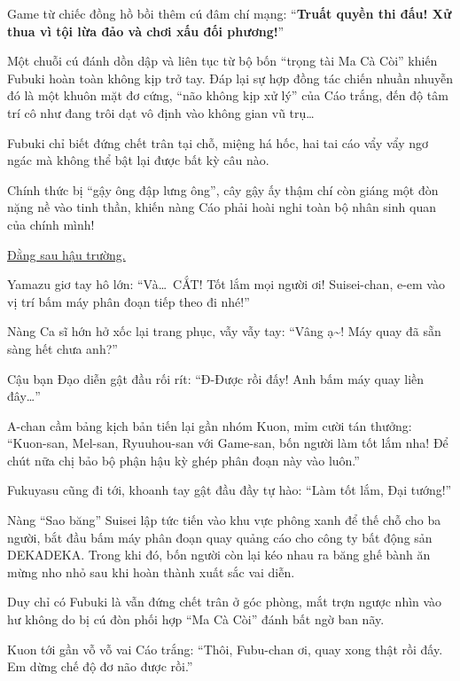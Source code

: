 \documentclass[../main.tex]{subfiles}
\begin{document}
Game từ chiếc đồng hồ bồi thêm cú đâm chí mạng: ``\textbf{Truất quyền thi đấu! Xử thua vì tội lừa đảo và chơi xấu đối phương!}''

Một chuỗi cú đánh dồn dập và liên tục từ bộ bốn ``trọng tài Ma Cà Còi'' khiến Fubuki hoàn toàn không kịp trở tay. Đáp lại sự hợp đồng tác chiến nhuần nhuyễn đó là một khuôn mặt đơ cứng, ``não không kịp xử lý'' của Cáo trắng, đến độ tâm trí cô như đang trôi dạt vô định vào không gian vũ trụ\dots


Fubuki chỉ biết đứng chết trân tại chỗ, miệng há hốc, hai tai cáo vẩy vẩy ngơ ngác mà không thể bật lại được bất kỳ câu nào.

Chính thức bị ``gậy ông đập lưng ông'', cây gậy ấy thậm chí còn giáng một đòn nặng nề vào tinh thần, khiến nàng Cáo phải hoài nghi toàn bộ nhân sinh quan của chính mình!

\omk

\begin{center}
  \uline{Đằng sau hậu trường.}
\end{center}

Yamazu giơ tay hô lớn: ``Và\dots\ CẮT! Tốt lắm mọi người ơi! Suisei-chan, e-em vào vị trí bấm máy phân đoạn tiếp theo đi nhé!''

Nàng Ca sĩ hớn hở xốc lại trang phục, vẫy vẫy tay: ``Vâng ạ\~{}! Máy quay đã sẵn sàng hết chưa anh?''

Cậu bạn Đạo diễn gật đầu rối rít: ``Đ-Được rồi đấy! Anh bấm máy quay liền đây\dots''

A-chan cầm bảng kịch bản tiến lại gần nhóm Kuon, mỉm cười tán thưởng: ``Kuon-san, Mel-san, Ryuuhou-san với Game-san, bốn người làm tốt lắm nha! Để chút nữa chị bảo bộ phận hậu kỳ ghép phân đoạn này vào luôn.''

Fukuyasu cũng đi tới, khoanh tay gật đầu đầy tự hào: ``Làm tốt lắm, Đại tướng!''

Nàng ``Sao băng'' Suisei lập tức tiến vào khu vực phông xanh để thế chỗ cho ba người, bắt đầu bấm máy phân đoạn quay quảng cáo cho công ty bất động sản DEKADEKA. Trong khi đó, bốn người còn lại kéo nhau ra băng ghế bành ăn mừng nho nhỏ sau khi hoàn thành xuất sắc vai diễn.

Duy chỉ có Fubuki là vẫn đứng chết trân ở góc phòng, mắt trợn ngược nhìn vào hư không do bị cú đòn phối hợp ``Ma Cà Còi'' đánh bất ngờ ban nãy.

Kuon tới gần vỗ vỗ vai Cáo trắng: ``Thôi, Fubu-chan ơi, quay xong thật rồi đấy. Em dừng chế độ đơ não được rồi.''
\end{document}
